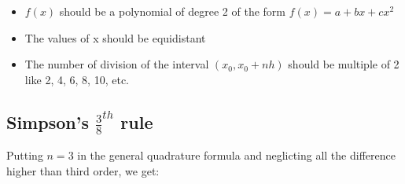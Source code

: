 \documentclass[10pt, twoside, a4paper]{article}
\begin{document}
\begin{itemize}
  \item $f(x)$ should be a polynomial of degree 2 of the form $f(x)=a+bx+cx^2$
  \item The values of x should be equidistant
  \item The number of division of the interval $(x_0,x_0+nh)$ should be
    multiple of 2 like 2, 4, 6, 8, 10, etc.
\end{itemize}

\subsection{Simpson's $\frac{3}{8}^{th}$ rule}%
Putting $n=3$ in the general quadrature formula and neglicting all the
difference higher than third order, we get:
\end{document}
